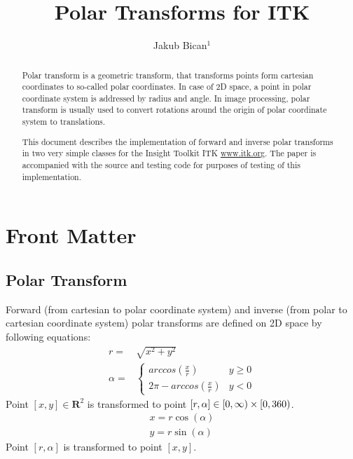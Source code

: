 \documentclass{InsightArticle}
\title{Polar Transforms for ITK}
\author{Jakub Bican$^{1}$}
\begin{document}
\maketitle


\ifhtml
\chapter*{Front Matter\label{front}}
\fi

\begin{abstract}
\noindent

Polar transform is a geometric transform, that transforms points form cartesian coordinates to so-called polar coordinates. In case of 2D space, a point in polar coordinate system is addressed by radius and angle. In image processing, polar transform is usually used to convert rotations around the origin of polar coordinate system to translations.

This document describes the implementation of forward and inverse polar transforms in two very simple classes for the Insight Toolkit ITK \url{www.itk.org}. The paper is accompanied with the source and testing code for purposes of testing of this implementation.

\end{abstract}


\section{Polar Transform}

Forward (from cartesian to polar coordinate system) and inverse (from polar to cartesian coordinate system) polar transforms  are defined on 2D space by following equations:
\begin{equation}
\begin{array}{ll}
r = & \sqrt{ x^2 + y^2 } \\
\alpha = & \left\{ \begin{array}{ll}
arccos( \frac{x}{r} ) & y \geq 0\\
2 \pi - arccos( \frac{x}{r} ) & y < 0
\end{array} \right.
\end{array}
\end{equation}
Point $[x,y] \in\mathbf{R}^2$ is transformed to point $[r,\alpha]\in[0,\infty)\times[0,360)$.
\begin{equation}
\begin{array}{ll}
x = r \cos(\alpha) \\
y = r \sin(\alpha)
\end{array}
\end{equation}
Point $[r,\alpha]$ is transformed to point $[x,y]$.
\end{document}
